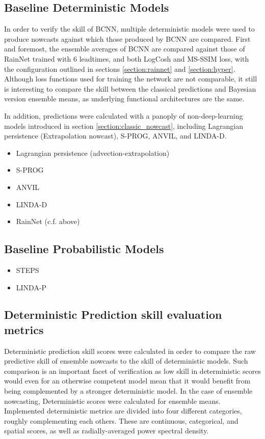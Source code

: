 \subsection{Baseline Deterministic Models}

In order to verify the skill of BCNN, multiple deterministic models were used to produce nowcasts against which those produced by BCNN are compared. First and foremost, the ensemble averages of BCNN are compared against those of RainNet trained with 6 leadtimes, and both LogCosh and MS-SSIM loss, with the configuration outlined in sections \ref{section:rainnet} and \ref{section:hyper}. Although loss functions used for training the network are not comparable, it still is interesting to compare the skill between the classical predictions and Bayesian version ensemble means, as underlying functional architectures are the same.

In addition, predictions were calculated with a panoply of non-deep-learning models introduced in section \ref{section:classic_nowcast}, including Lagrangian persistence (Extrapolation nowcast), S-PROG, ANVIL, and LINDA-D.

\begin{itemize}
	\item Lagrangian persistence (advection-extrapolation)
	\item S-PROG
	\item ANVIL
	\item LINDA-D
	\item RainNet (c.f. above)
\end{itemize}



\subsection{Baseline Probabilistic Models}

\begin{itemize}
	\item STEPS
	\item LINDA-P
\end{itemize}

\subsection{Deterministic Prediction skill evaluation metrics}

Deterministic prediction skill scores were calculated in order to compare the raw predictive skill of ensemble nowcasts to the skill of deterministic models. Such comparison is an important facet of verification as low skill in deterministic scores would even for an otherwise competent model mean that it would benefit from being complemented by a stronger deterministic model. In the case of ensemble nowcasting, Deterministic scores were calculated for ensemble means. Implemented deterministic metrics are divided into four different categories, roughly complementing each others. These are continuous, categorical, and spatial scores, as well as radially-averaged power spectral density.  


